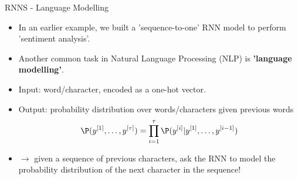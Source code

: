 \begin{vbframe}{RNNS - Language Modelling}
  \begin{itemize}
    \item In an earlier example, we built a 'sequence-to-one' RNN model to perform 'sentiment analysis'.
    \item Another common task in Natural Language Processing (NLP) is \textbf{'language modelling'}.
    \item Input: word/character, encoded as a one-hot vector.
    \item Output: probability distribution over words/characters given previous words $$\P(y^{[1]}, \dots, y^{[\tau]}) = \displaystyle \prod_{i=1}^{\tau} \P(y^{[i]}|y^{[1]}, \dots, y^{[i-1]})$$
    \item[] $\to$ given a sequence of previous characters, ask the RNN to model the probability distribution of the next character in the sequence!
   \end{itemize}
\end{vbframe}



